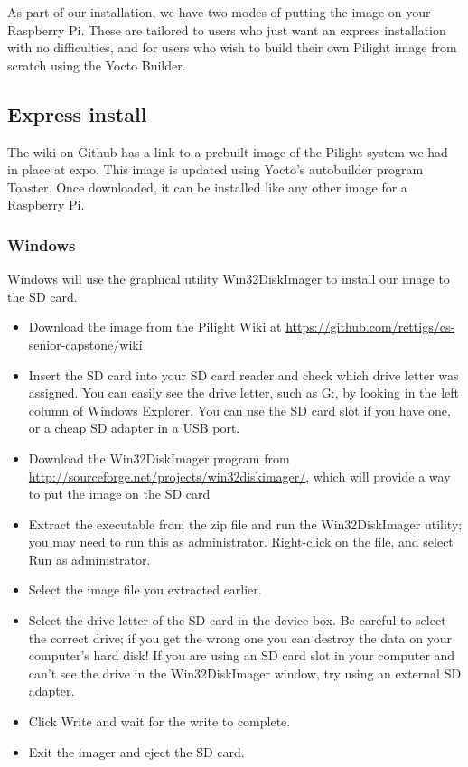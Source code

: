 As part of our installation, we have two modes of putting the image on your Raspberry Pi. These are tailored to users who just want an express installation with no difficulties, and for users who wish to build their own Pilight image from scratch using the Yocto Builder.
\subsection{Express install}
The wiki on Github has a link to a prebuilt image of the Pilight system we had in place at expo. This image is updated using Yocto's autobuilder program Toaster. Once downloaded, it can be installed like any other image for a Raspberry Pi.
\subsubsection{Windows}
Windows will use the graphical utility Win32DiskImager to install our image to the SD card.
\begin{itemize}
   \item Download the image from the Pilight Wiki at \url{https://github.com/rettigs/cs-senior-capstone/wiki}
   \item Insert the SD card into your SD card reader and check which drive letter was assigned. You can easily see the drive letter, such as G:, by looking in the left column of Windows Explorer. You can use the SD card slot if you have one, or a cheap SD adapter in a USB port.
   \item Download the Win32DiskImager program from \url{http://sourceforge.net/projects/win32diskimager/}, which will provide a way to put the image on the SD card
   \item Extract the executable from the zip file and run the Win32DiskImager utility; you may need to run this as administrator. Right-click on the file, and select Run as administrator.
   \item Select the image file you extracted earlier.
   \item Select the drive letter of the SD card in the device box. Be careful to select the correct drive; if you get the wrong one you can destroy the data on your computer's hard disk! If you are using an SD card slot in your computer and can't see the drive in the Win32DiskImager window, try using an external SD adapter.
   \item Click Write and wait for the write to complete.
   \item Exit the imager and eject the SD card.
\end{itemize}
